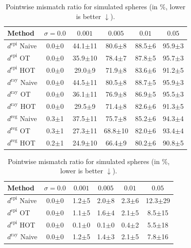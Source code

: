 \documentclass[10pt, twocolumn]{article}
\theoremstyle{definition}
\begin{document}
\begin{table}[t]
\scriptsize
\setlength{\tabcolsep}{2.0pt}
\centering
\begin{minipage}{0.48\linewidth}
\centering
\begin{tabular}{lccccc}
\toprule
Method & $\sigma=0.0$ & $0.001$ & $0.005$ & $0.01$ & $0.05$ \\
\midrule
$d^{\text{epi}}$ Naive & 0.0$\pm$0 & 44.1$\pm$11 & 80.6$\pm$8 & 88.5$\pm$6 & 95.9$\pm$3 \\
$d^{\text{epi}}$ OT & 0.0$\pm$0 & 35.9$\pm$10 & 78.4$\pm$7 & 87.8$\pm$5 & 95.7$\pm$3 \\
$d^{\text{epi}}$ HOT & 0.0$\pm$0 & 29.0$\pm$9 & 71.9$\pm$8 & 83.6$\pm$6 & 91.2$\pm$5 \\
\midrule
$d^{\text{ray}}$ Naive & 0.0$\pm$0 & 44.5$\pm$11 & 80.5$\pm$8 & 88.7$\pm$5 & 95.9$\pm$3 \\
$d^{\text{ray}}$ OT & 0.0$\pm$0 & 36.1$\pm$11 & 76.9$\pm$8 & 86.9$\pm$5 & 95.5$\pm$3 \\
$d^{\text{ray}}$ HOT & 0.0$\pm$0 & 29.5$\pm$9 & 71.4$\pm$8 & 82.6$\pm$6 & 91.3$\pm$5 \\
\midrule
$d^{\text{reg}}$ Naive & 0.3$\pm$1 & 37.5$\pm$11 & 75.7$\pm$8 & 85.2$\pm$6 & 94.3$\pm$4 \\
$d^{\text{reg}}$ OT & 0.3$\pm$1 & 27.3$\pm$11 & 68.8$\pm$10 & 82.0$\pm$6 & 93.4$\pm$4 \\
$d^{\text{reg}}$ HOT & 0.2$\pm$1 & 24.9$\pm$10 & 66.4$\pm$9 & 80.2$\pm$6 & 90.8$\pm$5 \\
\bottomrule
\end{tabular}
\caption{Pointwise mismatch ratio for simulated spheres (in \%, lower is better $\downarrow$).}
\label{tab:syn_point_mismatch}
\end{minipage}
\hfill
\begin{minipage}{0.48\linewidth}
\centering
\setlength{\tabcolsep}{2.0pt}
\begin{tabular}{lccccc}
\toprule
Method & $\sigma=0.0$ & $0.001$ & $0.005$ & $0.01$ & $0.05$ \\
\midrule
$d^{\text{epi}}$ Naive & 0.0$\pm$0 & 1.2$\pm$5 & 2.0$\pm$8 & 2.3$\pm$6 & 12.3$\pm$29 \\
$d^{\text{epi}}$ OT & 0.0$\pm$0 & 1.1$\pm$5 & 1.6$\pm$4 & 2.1$\pm$5 & 8.5$\pm$15 \\
$d^{\text{epi}}$ HOT & 0.0$\pm$0 & 0.1$\pm$0 & 0.1$\pm$0 & 0.4$\pm$2 & 5.5$\pm$18 \\
\midrule
$d^{\text{ray}}$ Naive & 0.0$\pm$0 & 1.2$\pm$5 & 1.4$\pm$3 & 2.1$\pm$5 & 7.8$\pm$16 \\

\end{tabular}
\end{minipage}
\end{table}
\end{document}
